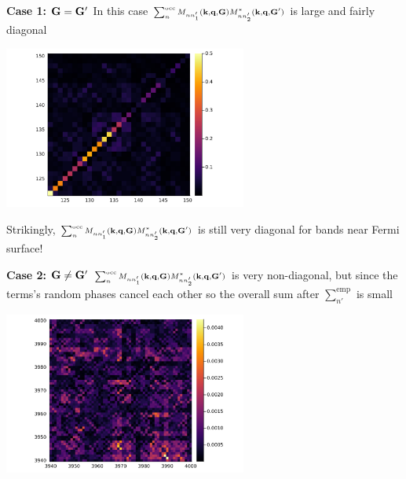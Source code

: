 \documentclass[t,aspectratio=169]{beamer}
\begin{document}
\begin{frame}[allowframebreaks]
\framebreak

\textbf{Case 1: $\vb{G} = \vb{G}'$}  In this case $\scriptstyle \sum_{n}^{\text{occ}} M_{n n'_1} (\vb{k}, \vb{q}, \vb{G}) M^*_{nn'_2} (\vb{k}, \vb{q}, \vb{G}')$ is large and fairly diagonal

\begin{center}
    \includegraphics[width=0.6\textwidth]{../data/chi/nc_range-121-150-k_idx-2-q_idx-3-G_idx-100.png}
\end{center}

Strikingly, $\scriptstyle \sum_{n}^{\text{occ}} M_{n n'_1} (\vb{k}, \vb{q}, \vb{G}) M^*_{nn'_2} (\vb{k}, \vb{q}, \vb{G}')$ is still very diagonal for bands near Fermi surface!

\framebreak

\textbf{Case 2: $\vb{G} \neq \vb{G}'$} $\scriptstyle \sum_{n}^{\text{occ}} M_{n n'_1} (\vb{k}, \vb{q}, \vb{G}) M^*_{nn'_2} (\vb{k}, \vb{q}, \vb{G}')$ is very non-diagonal, 
but since the terms's random phases cancel each other so the overall sum after $\sum_{n'}^{\text{emp}}$ is small

\begin{center}
    \includegraphics[width=0.6\textwidth]{../data/chi/nc_range-3939-4000-k_idx-2-q_idx-3-G1_idx-2000-G2_idx-2001.png}
\end{center}


\end{frame}
\end{document}
